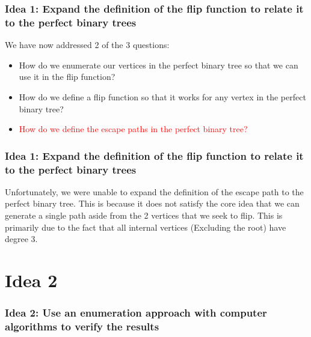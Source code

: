 \documentclass[10pt,]{beamer}
\theoremstyle{conjectureStyle}
\theoremstyle{notationStyle}
\begin{document}
\begin{frame}\frametitle{Idea 1: Expand the definition of the flip function to relate it to the perfect binary trees}
    We have now addressed 2 of the 3 questions:
    \begin{itemize}
        \item \textcolor{textGreen}{How do we enumerate our vertices in the perfect binary tree so that we can use it in the flip function?}
        \item \textcolor{textGreen}{How do we define a flip function so that it works for any vertex in the perfect binary tree?}
        \item \textcolor{red}{How do we define the escape paths in the perfect binary tree?}
    \end{itemize}
\end{frame}

\begin{frame}\frametitle{Idea 1: Expand the definition of the flip function to relate it to the perfect binary trees}
    Unfortunately, we were unable to expand the definition of the escape path to the perfect binary tree. This is because it does not satisfy the core idea that we can generate a single path aside from the 2 vertices that we seek to flip. This is primarily due to the fact that all internal vertices (Excluding the root) have degree 3.
\end{frame}

\section{Idea 2}
\begin{frame}\frametitle{Idea 2: Use an enumeration approach with computer algorithms to verify the results}
    \begin{algorithm}[H]


    \end{algorithm}
\end{frame}
\end{document}
